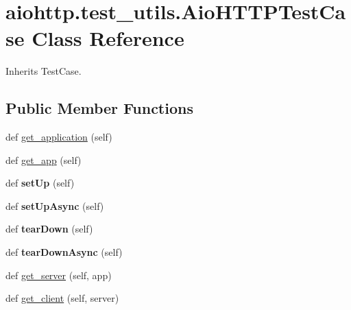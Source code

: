 \hypertarget{classaiohttp_1_1test__utils_1_1_aio_h_t_t_p_test_case}{}\section{aiohttp.\+test\+\_\+utils.\+Aio\+H\+T\+T\+P\+Test\+Case Class Reference}
\label{classaiohttp_1_1test__utils_1_1_aio_h_t_t_p_test_case}


Inherits Test\+Case.

\subsection*{Public Member Functions}
\begin{DoxyCompactItemize}
\item 
def \hyperlink{classaiohttp_1_1test__utils_1_1_aio_h_t_t_p_test_case_a6a02641733b8dfb6be24dd2c60c6e688}{get\+\_\+application} (self)
\item 
def \hyperlink{classaiohttp_1_1test__utils_1_1_aio_h_t_t_p_test_case_ab134b2c3dee9d110f75f19b1facb3ac8}{get\+\_\+app} (self)
\item 
\mbox{\label{classaiohttp_1_1test__utils_1_1_aio_h_t_t_p_test_case_a75ea925c204e2950402aa5f733e3487c}} 
def {\bfseries set\+Up} (self)
\item 
\mbox{\label{classaiohttp_1_1test__utils_1_1_aio_h_t_t_p_test_case_a1507d190d87c9ac990ecef58d67663db}} 
def {\bfseries set\+Up\+Async} (self)
\item 
\mbox{\label{classaiohttp_1_1test__utils_1_1_aio_h_t_t_p_test_case_a2e714c2395777f6e8c8788797f4546ec}} 
def {\bfseries tear\+Down} (self)
\item 
\mbox{\label{classaiohttp_1_1test__utils_1_1_aio_h_t_t_p_test_case_a316dc38e9a4a5a14c36a829189ed3a61}} 
def {\bfseries tear\+Down\+Async} (self)
\item 
def \hyperlink{classaiohttp_1_1test__utils_1_1_aio_h_t_t_p_test_case_aac2a9727aa230f539d32565db240cd08}{get\+\_\+server} (self, app)
\item 
def \hyperlink{classaiohttp_1_1test__utils_1_1_aio_h_t_t_p_test_case_a903b62e819654e99882c50a9d8917cdb}{get\+\_\+client} (self, server)
\end{DoxyCompactItemize}

